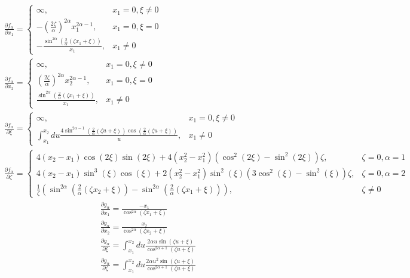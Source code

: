 \documentclass[12pt]{article}
\begin{document}
\begin{subequations}
\begin{align}
&\frac{\partial f_{\alpha}}{\partial x_1} =
	\begin{cases}
	\infty,													& x_1=0, \xi\neq0\\
	-\left(\frac{2\zeta}{\alpha}\right)^{2\alpha}x_1^{2\alpha-1},			& x_1=0, \xi=0\\
	-\frac{\sin^{2\alpha}\left(\frac{2}{\alpha}(\zeta x_1+\xi)\right)}{x_1},	& x_1\neq0
	\end{cases}\label{eq:dfdx_1}\\
&\frac{\partial f_{\alpha}}{\partial x_2} =
	\begin{cases}
	\infty,													& x_1=0, \xi\neq0\\
	\left(\frac{2\zeta}{\alpha}\right)^{2\alpha}x_2^{2\alpha-1},			& x_1=0, \xi=0\\
	\frac{\sin^{2\alpha}\left(\frac{2}{\alpha}(\zeta x_1+\xi)\right)}{x_1},	& x_1\neq0
	\end{cases}\label{eq:dfdx_2}\\
&\frac{\partial f_{\alpha}}{\partial \xi} = 
	\begin{cases}
	\infty,													& x_1 = 0,\xi\neq0\\
	\int_{x_1}^{x_2}du\frac{4\sin^{2\alpha-1}\left(\frac{2}{\alpha}(\zeta u+\xi)\right)\cos\left(\frac{2}{\alpha}(\zeta u+\xi)\right)}{u},	& x_1\neq0
	\end{cases}\label{eq:dfdxi}\\
&\frac{\partial f_{\alpha}}{\partial\zeta} = 
	\begin{cases}
	4(x_2-x_1)\cos(2\xi)\sin(2\xi)+4(x_2^2-x_1^2)(\cos^2(2\xi)-\sin^2(2\xi))\zeta,	&\zeta=0,\alpha=1\\
	4(x_2-x_1)\sin^3(\xi)\cos(\xi)+2(x_2^2-x_1^2)\sin^2(\xi)(3\cos^2(\xi)-\sin^2(\xi))\zeta,	&\zeta=0,\alpha=2\\
	\frac{1}{\zeta}\left(\sin^{2\alpha}\left(\frac{2}{\alpha}(\zeta x_2+\xi)\right)-\sin^{2\alpha}\left(\frac{2}{\alpha}(\zeta x_1+\xi)\right)\right),		&\zeta\neq0
	\end{cases}\label{eq:dfdzeta}
\end{align}
\end{subequations}
\begin{subequations}
\begin{align}
&\frac{\partial g_{\alpha}}{\partial x_1}=\frac{-x_1}{\cos^{2\alpha}(\zeta x_1 +\xi)}\label{eq:dgdx_1}\\
&\frac{\partial g_{\alpha}}{\partial x_2}=\frac{x_2}{\cos^{2\alpha}(\zeta x_2+\xi)}\label{eq:dgdx_2}\\
&\frac{\partial g_{\alpha}}{\partial\xi}=\int_{x_1}^{x_2}du\frac{2\alpha u \sin(\zeta u+\xi)}{\cos^{2\alpha+1}(\zeta u+\xi)}\label{eq:dgdxi}\\
&\frac{\partial g_{\alpha}}{\partial\zeta}=\int_{x_1}^{x_2}du\frac{2\alpha u^2\sin(\zeta u+\xi)}{\cos^{2\alpha+1}(\zeta u +\xi)}\label{eq:dgdzeta}
\end{align}
\end{subequations}

	
\clearpage


\end{document}
